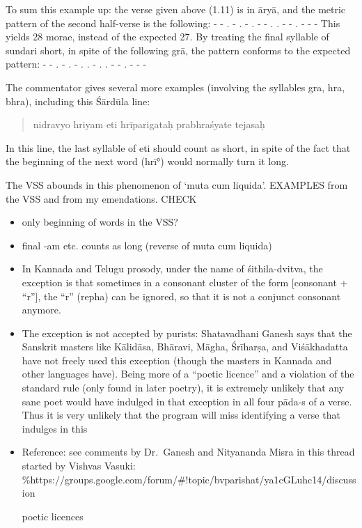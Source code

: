 \documentclass[11pt]{book}
\begin{document}
To sum this example up: the verse given above (1.11) is in āryā, and the
metric pattern of the second half-verse is the following: - - . - . - .
- - . . - - . - - - This yields 28 morae, instead of the expected 27. By
treating the final syllable of sundari short, in spite of the following
grā, the pattern conforms to the expected pattern: - - . - . - . . - . .
- - . - - -

The commentator gives several more examples (involving the syllables
gra, hra, bhra), including this Śārdūla line:

\begin{quote}
nidravyo hriyam eti hrīparigataḥ prabhraśyate tejasaḥ
\end{quote}

In this line, the last syllable of eti should count as short, in spite
of the fact that the beginning of the next word (hrī°) would normally
turn it long.

The VSS abounds in this phenomenon of `muta cum liquida'. EXAMPLES from
the VSS and from my emendations. CHECK

\begin{itemize}
\item
  only beginning of words in the VSS?
\item
  final -am etc. counts as long (reverse of muta cum liquida)
\item
  In Kannada and Telugu prosody, under the name of śithila-dvitva, the
  exception is that sometimes in a consonant cluster of the form
  {[}consonant + ``r''{]}, the ``r'' (repha) can be ignored, so that it
  is not a conjunct consonant anymore.
\item
  The exception is not accepted by purists: Shatavadhani Ganesh says
  that the Sanskrit masters like Kālidāsa, Bhāravi, Māgha, Śrīharṣa, and
  Viśākhadatta have not freely used this exception (though the masters
  in Kannada and other languages have). Being more of a ``poetic
  licence'' and a violation of the standard rule (only found in later
  poetry), it is extremely unlikely that any sane poet would have
  indulged in that exception in all four pāda-s of a verse. Thus it is
  very unlikely that the program will miss identifying a verse that
  indulges in this
\item
  Reference: see comments by Dr.~Ganesh and Nityananda Misra in this
  thread started by Vishvas Vasuki:
  \%https://groups.google.com/forum/\#!topic/bvparishat/ya1cGLuhc14/discussion
  
  poetic licences
\end{itemize}
\end{document}
